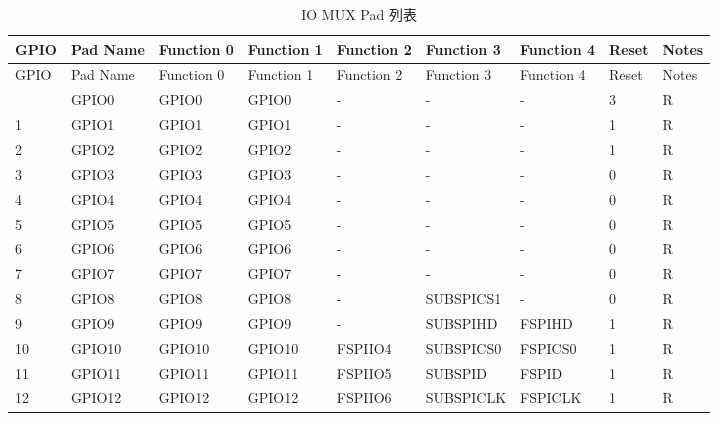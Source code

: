 
   \begin{longtable}[c]{|p{0.7cm}|p{1.9cm}|p{1.9cm}|p{1.6cm}|p{1.6cm}|p{1.8cm}|p{1.6cm}|p{0.7cm}|p{0.7cm}| }
   \caption{IO MUX Pad 列表}
    \label{table:iomux_pads} \\
        \hline
        \rowcolor{lightgray}
GPIO & Pad Name & Function 0 & Function 1 & Function 2 & Function 3 & Function 4 & Reset & Notes \\
 \hline
\endfirsthead
        \hline
        \rowcolor{lightgray}
        GPIO & Pad Name & Function 0 & Function 1 & Function 2 & Function 3 & Function 4 & Reset & Notes \\
        \hline
        \endhead
        \endfoot
0 & GPIO0            & GPIO0         & GPIO0   & -          & -            & -           & 3 & R \\ \hline
1 & GPIO1            & GPIO1         & GPIO1   & -          & -            & -           & 1 & R \\ \hline
2 & GPIO2            & GPIO2         & GPIO2   & -          & -            & -           & 1 & R \\ \hline
3 & GPIO3            & GPIO3         & GPIO3   & -          & -            & -           & 0 & R \\ \hline
4 & GPIO4            & GPIO4         & GPIO4   & -          & -            & -           & 0 & R \\ \hline
5 & GPIO5            & GPIO5         & GPIO5   & -          & -            & -           & 0 & R \\ \hline
6 & GPIO6            & GPIO6         & GPIO6   & -          & -            & -           & 0 & R \\ \hline
7 & GPIO7            & GPIO7         & GPIO7   & -          & -            & -           & 0 & R \\ \hline
8 & GPIO8            & GPIO8         & GPIO8   & -          & SUBSPICS1    & -           & 0 & R \\ \hline
9 & GPIO9            & GPIO9         & GPIO9   & -          & SUBSPIHD     & FSPIHD      & 1 & R \\ \hline
10 & GPIO10          &  GPIO10       & GPIO10  & FSPIIO4    & SUBSPICS0    & FSPICS0     & 1 & R \\ \hline
11 & GPIO11          &  GPIO11       & GPIO11  & FSPIIO5    & SUBSPID      & FSPID       & 1 & R \\ \hline
12 & GPIO12          &  GPIO12       & GPIO12  & FSPIIO6    & SUBSPICLK    & FSPICLK     & 1 & R \\ \hline

\end{longtable}
